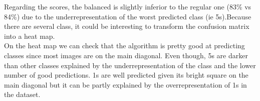 Regarding the scores, the balanced is slightly inferior to the regular one (83\% vs 84\%) due to the underrepresentation of the worst predicted class (ie 5s).Because there are several class, it could be interesting to transform the confusion matrix into a heat map. \\

On the heat map we can check that the algorithm is pretty good at predicting classes since most images are on the main diagonal. Even though, 5s are darker than other classes explained by the underrepresentation of the class and the lower number of good predictions. 1s are well predicted given its bright square on the main diagonal but it can be partly explained by the overrepresentation of 1s in the dataset. 


